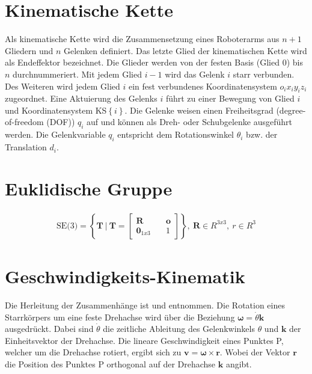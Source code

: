 \setcounter{chapter}{1}
\setcounter{section}{0}
\setcounter{table}{0}
\setcounter{figure}{0}
%

\label{add:PSP}




\setcounter{chapter}{2}
\setcounter{section}{0}
\setcounter{table}{0}
\setcounter{figure}{0}
%
\section{Kinematische Kette}
\label{add:kinematische-kette}
Als kinematische Kette wird die Zusammensetzung eines Roboterarms aus $n+1$ Gliedern und $n$ Gelenken definiert. Das letzte Glied der kinematischen Kette wird als Endeffektor bezeichnet. Die Glieder werden von der festen Basis (Glied $0$) bis $n$ durchnummeriert. Mit jedem Glied $i-1$ wird das Gelenk $i$ starr verbunden. Des Weiteren wird jedem Glied $i$ ein fest verbundenes Koordinatensystem $o_ix_iy_iz_i$ zugeordnet. Eine Aktuierung des Gelenks $i$ führt zu einer Bewegung von Glied $i$ und Koordinatensystem KS$\left\{i\right\}$. Die Gelenke weisen einen Freiheitsgrad (degree-of-freedom (DOF)) $q_i$ auf und können als Dreh- oder Schubgelenke ausgeführt werden. Die Gelenkvariable $q_i$ entspricht dem Rotationswinkel $\theta_i$ bzw. der Translation $d_i$. \cite[S.~75]{Spong.2020}
%
\setcounter{section}{1}
\section{Euklidische Gruppe}
\label{add:SE3}
\begin{align} 
	\text{SE(3)} = \left\{{\bm{T}} \ | \ \bm{T}=\begin{bmatrix} {\bm{R}} &\quad {\bm{o}}\\ \bm{0}_{1x3} &\quad 1 \end{bmatrix}\right\}, \ \bm{R} \in {R}^{3x3}, \ {r} \in {R}^{3}  
\end{align} 

\cite[S.~534]{Spong.2020}
\setcounter{section}{2}
\section{Geschwindigkeits-Kinematik}
\label{add:geschwindigkeitskinematik}
Die Herleitung der Zusammenhänge ist  \cite[S.~79~f.]{Kemmetmueller.2023} und  \cite[S.~106]{Spong.2020} entnommen. Die Rotation eines Starrk{\"o}rpers um eine feste Drehachse wird über die Beziehung $\bm{\omega} = \dot{\theta}\bm{k}$ ausgedr{\"u}ckt. Dabei sind $\dot{\theta}$ die zeitliche Ableitung des Gelenkwinkels $\theta$ und $\bm{k}$ der Einheitsvektor der Drehachse. Die lineare Geschwindigkeit eines Punktes P, welcher um die Drehachse rotiert, ergibt sich zu $\bm{v} = \bm{\omega} \times \bm{r}$. Wobei der Vektor $\bm{r}$ die Position des Punktes P orthogonal auf der Drehachse $\bm{k}$ angibt. \cite[S.~102]{Spong.2020} 
%
